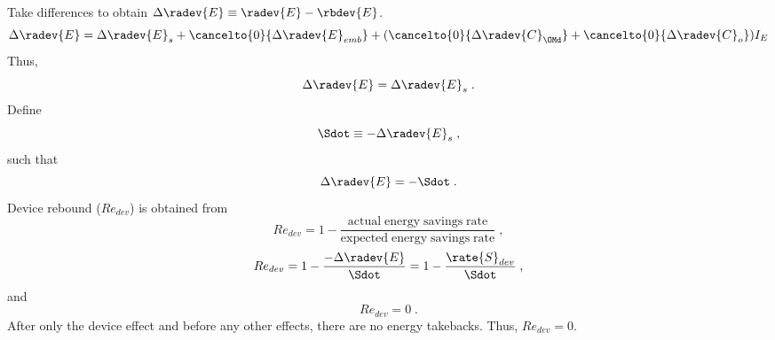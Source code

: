 \begin{landscape}
{Take differences to obtain $\Delta \radev{E} \equiv \radev{E} - \rbdev{E}$.
  \begin{equation}
  \Delta \radev{E} = \Delta \radev{E}_s
  + \cancelto{0}{\Delta \radev{E}_{emb}} 
  + (\cancelto{0}{\Delta \radev{C}_{\OMd}} 
      + \cancelto{0}{\Delta \radev{C}_o}) I_E
  \end{equation}
  Thus, 
  \begin{equation}
  \Delta \radev{E} = \Delta \radev{E}_s \; .
  \end{equation}
  Define
  \begin{equation} \label{eq:Sdot_def}
  \Sdot \equiv -\Delta \radev{E}_s \; ,
  \end{equation}
  such that
  \begin{equation}
  \Delta \radev{E} = -\Sdot \; .
  \end{equation}
  Device rebound ($Re_{dev}$) is obtained from 
  \begin{equation}
  Re_{dev} = 1 - \frac{\mathrm{actual \; energy \; savings \; rate}}{\mathrm{expected \; energy \; savings \; rate}} \; ,
  \end{equation}
  \begin{equation}
  Re_{dev} = 1 - \frac{-\Delta \radev{E}}{\Sdot} = 1 - \frac{\rate{S}_{dev}}{\Sdot} \; ,
  \end{equation}
  and
  \begin{equation}
  Re_{dev} = 0 \; .
  \end{equation}
  After only the device effect and before any other effects, 
  there are no energy takebacks. 
  Thus, $Re_{dev} = 0$.
}
{
    ~
    
}
\end{landscape}
